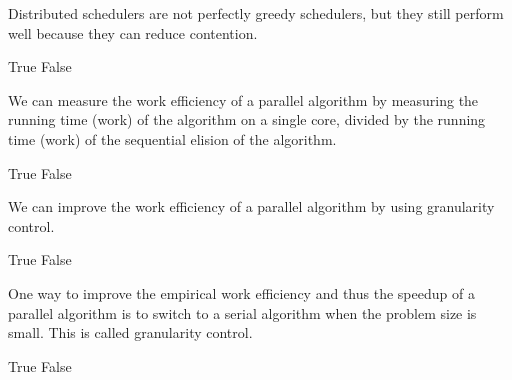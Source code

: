 \begin{cluster}
\begin{parts}
\begin{problem}

Distributed schedulers are not perfectly greedy schedulers, but they
still perform well because they can reduce contention. 

\begin{pickone}
\correctchoice True
\choice False
\end{pickone}


\end{problem}


\begin{problem}[2]

We can measure the work efficiency of a parallel algorithm by
measuring the running time (work) of the algorithm on a single core,
divided by the running time (work) of the sequential elision of the
algorithm.

\begin{pickone}
\choice True
\correctchoice False
\end{pickone}

\end{problem}
 


\begin{problem}[2]

We can improve the work efficiency of a parallel algorithm by using
granularity control.

\begin{pickone}
\correctchoice True
\choice False
\end{pickone}


\end{problem}

\begin{problem}[2]
One way to improve the empirical work efficiency and thus the speedup
of a parallel algorithm is to switch to a serial algorithm when the
problem size is small. This is called granularity control.


\begin{pickone}
\correctchoice True
\choice False
\end{pickone}

\end{problem}

\begin{problem}[2]


\end{problem}
\end{parts}
\end{cluster}
